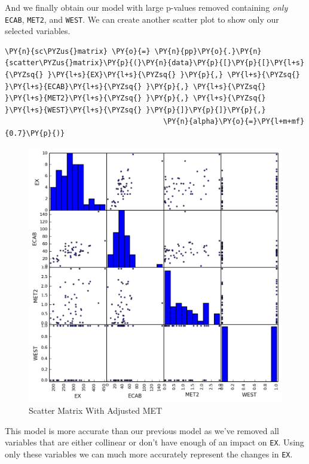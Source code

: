 \documentclass[10pt]{article}\usepackage[]{graphicx}\usepackage[]{xcolor}
\begin{document}
    And we finally obtain our model with large p-values removed containing
\emph{only} \texttt{ECAB}, \texttt{MET2}, and \texttt{WEST}. We can
create another scatter plot to show only our selected variables.

    \begin{Verbatim}[commandchars=\\\{\}]
\PY{n}{sc\PYZus{}matrix} \PY{o}{=} \PY{n}{pp}\PY{o}{.}\PY{n}{scatter\PYZus{}matrix}\PY{p}{(}\PY{n}{data}\PY{p}{[}\PY{p}{[}\PY{l+s}{\PYZsq{} }\PY{l+s}{EX}\PY{l+s}{\PYZsq{} }\PY{p}{,} \PY{l+s}{\PYZsq{} }\PY{l+s}{ECAB}\PY{l+s}{\PYZsq{} }\PY{p}{,} \PY{l+s}{\PYZsq{} }\PY{l+s}{MET2}\PY{l+s}{\PYZsq{} }\PY{p}{,} \PY{l+s}{\PYZsq{} }\PY{l+s}{WEST}\PY{l+s}{\PYZsq{} }\PY{p}{]}\PY{p}{]}\PY{p}{,}
                                     \PY{n}{alpha}\PY{o}{=}\PY{l+m+mf}{0.7}\PY{p}{)}
\end{Verbatim}

    \begin{figure}[H]
        \centering
        \includegraphics[scale=0.6]{./img/scatter_matrix2.png}
        \caption{Scatter Matrix With Adjusted MET}
        \label{fig:scatter_matrix2}
    \end{figure}
    
    This model is more accurate than our previous model as we've removed all variables that are either collinear or
    don't have enough of an impact on \texttt{EX}. Using only these variables we can much more accurately represent the
    changes in \texttt{EX}.
\end{document}
